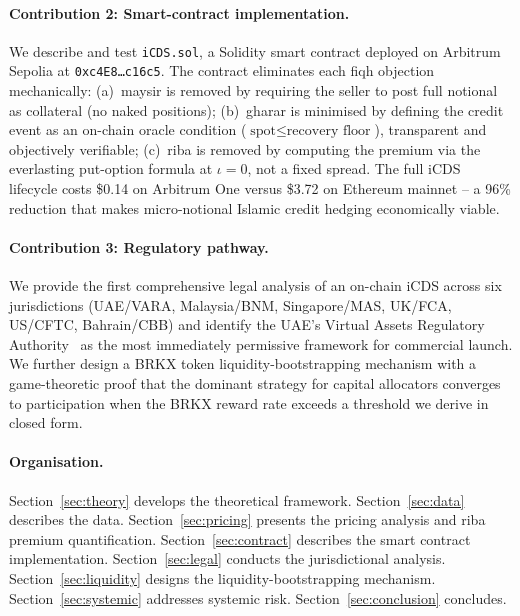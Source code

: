 \documentclass[12pt]{article}
\theoremstyle{plain}
\theoremstyle{definition}
\theoremstyle{remark}
\begin{document}
\paragraph{Contribution 2: Smart-contract implementation.}
We describe and test \texttt{iCDS.sol}, a Solidity smart contract deployed on
Arbitrum Sepolia at \texttt{0xc4E8\ldots c16c5}.
The contract eliminates each fiqh objection mechanically:
(a)~maysir is removed by requiring the seller to post full notional as
collateral (no naked positions);
(b)~gharar is minimised by defining the credit event as an on-chain oracle
condition ($\text{spot} \leq \text{recovery floor}$), transparent and
objectively verifiable;
(c)~riba is removed by computing the premium via the everlasting put-option
formula at $\iota = 0$, not a fixed spread.
The full iCDS lifecycle costs \$0.14 on Arbitrum One versus \$3.72 on
Ethereum mainnet -- a 96\% reduction that makes micro-notional Islamic
credit hedging economically viable.

\paragraph{Contribution 3: Regulatory pathway.}
We provide the first comprehensive legal analysis of an on-chain iCDS across
six jurisdictions (UAE/VARA, Malaysia/BNM, Singapore/MAS, UK/FCA, US/CFTC,
Bahrain/CBB) and identify the UAE's Virtual Assets Regulatory Authority~\cite{VARA2023}
as the most immediately permissive framework for commercial launch.
We further design a BRKX token liquidity-bootstrapping mechanism with a
game-theoretic proof that the dominant strategy for capital allocators
converges to participation when the BRKX reward rate exceeds a threshold
we derive in closed form.

\paragraph{Organisation.}
Section~\ref{sec:theory} develops the theoretical framework.
Section~\ref{sec:data} describes the data.
Section~\ref{sec:pricing} presents the pricing analysis and riba premium
quantification.
Section~\ref{sec:contract} describes the smart contract implementation.
Section~\ref{sec:legal} conducts the jurisdictional analysis.
Section~\ref{sec:liquidity} designs the liquidity-bootstrapping mechanism.
Section~\ref{sec:systemic} addresses systemic risk.
Section~\ref{sec:conclusion} concludes.

\end{document}
